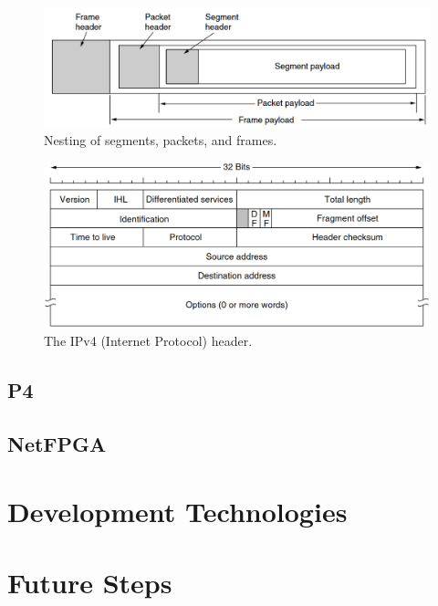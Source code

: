 \documentclass[12pt, a4paper, twoside, onecolumn]{article}
\begin{document}
\begin{figure}[h]
	\begin{center}
		\includegraphics[width=14cm]{frames.png}
	\end{center}
	\caption{Nesting of segments, packets, and frames. \cite{tanenbaum}}
	\label{segments_packets_frames}
\end{figure}

\begin{figure}[h]
	\begin{center}
		\includegraphics[width=14cm]{ip_header.png}
	\end{center}
	\caption{The IPv4 (Internet Protocol) header. \cite{tanenbaum}}
	\label{ip_header}
\end{figure}

\subsection{P4}
\label{p4_research}

\subsection{NetFPGA}
\label{netfpga_research}

\section{Development Technologies}


\section{Future Steps}
\end{document}
